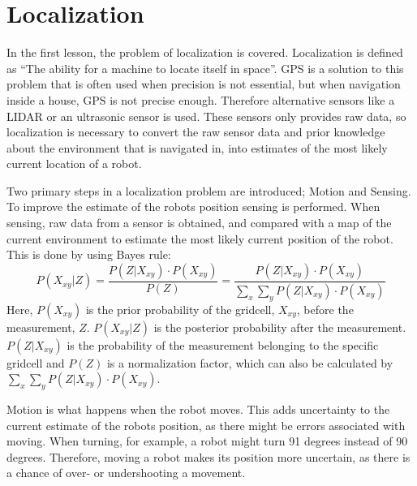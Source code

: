 \documentclass[Main]{subfiles}
\begin{document}
\section{Localization} %
	\label{sec:localization}
In the first lesson, the problem of localization is covered. 
Localization is defined as “The ability for a machine to locate itself in space”. 
GPS is a solution to this problem that is often used when precision is not essential, but when navigation inside a house, GPS is not precise enough. 
Therefore alternative sensors like a LIDAR or an ultrasonic sensor is used. 
These sensors only provides raw data, so localization is necessary to convert the raw sensor data and prior knowledge about the environment that is navigated in, into estimates of the most likely current location of a robot.

Two primary steps in a localization problem are introduced; Motion and Sensing.
To improve the estimate of the robots position sensing is performed. 
When sensing, raw data from a sensor is obtained, and compared with a map of the current environment to estimate the most likely current position of the robot. 
This is done by using Bayes rule:
\begin{equation}
\label{eq:bayes_rule}
P(X_{xy}|Z) = \frac{P(Z|X_{xy})\cdot P(X_{xy})}{P(Z)} = \frac{P(Z|X_{xy})\cdot P(X_{xy})}{\sum_{x} \sum_{y} P(Z|X_{xy})\cdot P(X_{xy})}
\end{equation}
Here, $P(X_{xy})$ is the prior probability of the gridcell, $X_{xy}$, before the measurement, $Z$.
$P(X_{xy}|Z)$ is the posterior probability after the measurement. 
$P(Z|X_{xy})$ is the probability of the measurement belonging to the specific gridcell and $P(Z)$ is a normalization factor, which can also be calculated by $\sum_{x} \sum_{y} P(Z|X_{xy})\cdot P(X_{xy})$.

Motion is what happens when the robot moves. 
This adds uncertainty to the current estimate of the robots position, as there might be errors associated with moving. 
When turning, for example, a robot might turn 91 degrees instead of 90 degrees. 
Therefore, moving a robot makes its position more uncertain, as there is a chance of over- or undershooting a movement.
\end{document}
